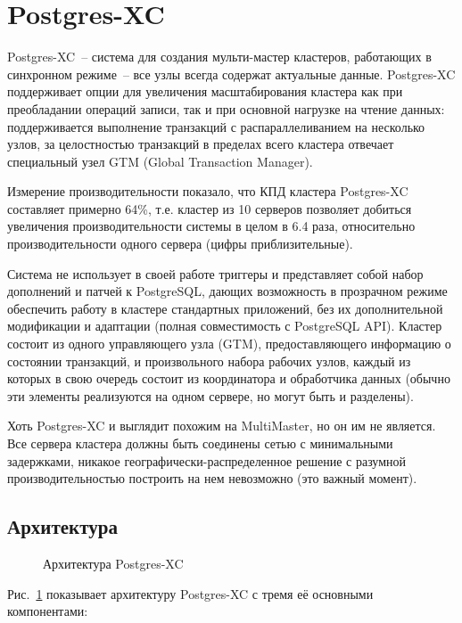 \section{Postgres-XC}
\label{sec:postgres-xc}

Postgres-XC~-- система для создания мульти-мастер кластеров, работающих в синхронном режиме~-- все узлы всегда содержат актуальные данные. Postgres-XC поддерживает опции для увеличения масштабирования кластера как при преобладании операций записи, так и при основной нагрузке на чтение данных: поддерживается выполнение транзакций с распараллеливанием на несколько узлов, за целостностью транзакций в пределах всего кластера отвечает специальный узел GTM (Global Transaction Manager).

Измерение производительности показало, что КПД кластера Postgres-XC составляет примерно 64\%, т.е. кластер из 10 серверов позволяет добиться увеличения производительности системы в целом в 6.4 раза, относительно производительности одного сервера (цифры приблизительные). 

Система не использует в своей работе триггеры и представляет собой набор дополнений и патчей к PostgreSQL, дающих возможность в прозрачном режиме обеспечить работу в кластере стандартных приложений, без их дополнительной модификации и адаптации (полная совместимость с PostgreSQL API). Кластер состоит из одного управляющего узла (GTM), предоставляющего информацию о состоянии транзакций, и произвольного набора рабочих узлов, каждый из которых в свою очередь состоит из координатора и обработчика данных (обычно эти элементы реализуются на одном сервере, но могут быть и разделены).

Хоть Postgres-XC и выглядит похожим на MultiMaster, но он им не является. Все сервера кластера должны быть соединены сетью с минимальными задержками, никакое географически-распределенное решение с разумной производительностью построить на нем невозможно (это важный момент).

\subsection{Архитектура}

\begin{figure}[ht!]
  \caption{Архитектура Postgres-XC}
  \label{fig:postgres-xc1}
\end{figure}

Рис.~\ref{fig:postgres-xc1} показывает архитектуру Postgres-XC с тремя её основными компонентами:

